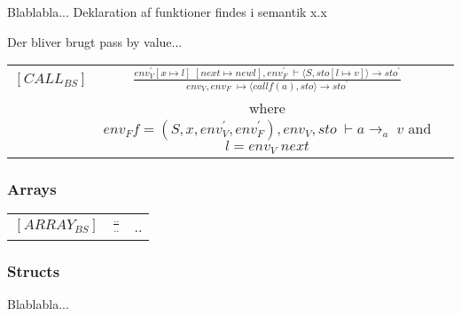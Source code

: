 Blablabla... Deklaration af funktioner findes i semantik x.x 

Der bliver brugt pass by value...



\begin{semantik}
    \bgroup
    \def\arraystretch{1.5}
    \begin{table}[H]
    \centering
    \begin{tabular}{l c l}
        
        $[CALL_{BS}]$ & 
        $ \frac
        {
            env_V^\prime [x \mapsto l]\;[next \mapsto new l], env_F^\prime\;\vdash \langle S, sto[l \mapsto v] \rangle \rightarrow sto^\prime
        }
        {
            env_V, env_F\;\mapsto \langle call f(a), sto \rangle \rightarrow sto^\prime
        } $ & \\
        
        & where $ env_F f = (S, x, env_V^\prime, env_F^\prime), env_V, sto\;\vdash a \rightarrow_a\;v$ and $l = env_V\;next $&
        
    \end{tabular}
    \end{table}
    \egroup
    \caption{Funktionskald}
    \label{sem:funktionskald}
\end{semantik}

    
\noindent \subsubsection{Arrays}


    
\begin{semantik}
    \bgroup
    \def\arraystretch{3}
    \begin{table}[H]
    \centering
    \begin{tabular}{l c l}
        
        $[ARRAY_{BS}]$ & $
        \frac{..}
        {..}
        $ & .. \\
        
    \end{tabular}
    \end{table}
    \egroup
    \caption{Array}
    \label{sem:arrayvalue}
\end{semantik}
    
\noindent \subsubsection{Structs}
Blablabla... 


